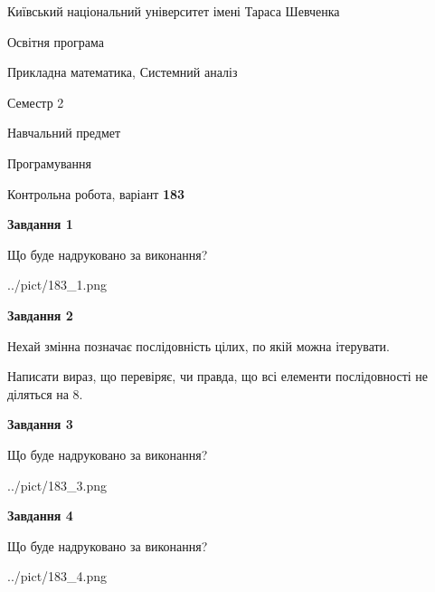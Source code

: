 \documentclass[12pt, ukrainian]{article}
\begin{document}
{{\begin {small}\par
{ \center  Київський національний університет імені Тараса Шевченка \par}
{\parbox {5 cm}{Освітня програма \hfill}{\parbox {8 cm}{Прикладна математика, Системний аналіз \hfill}}\parbox {5 cm}{\hfill Семестр 2}}\par
{\parbox {5 cm} {Навчальний предмет \hfill}\parbox {7 cm}{Програмування \hfill}\parbox {6cm}{\hfill}\par}\vspace{-7pt} \end{small}}{\center Контрольна робота, варіант  \No \textbf
{ 183 }\par}}
{
\begin {large}
{\begin {center}\textbf{Завдання 1}\end {center}}\par
Що буде надруковано за виконання?\par\par
\begin{center}
	{../pict/183_1.png}
\end{center}
\newpage

{\begin {center}\textbf{Завдання 2}\end {center}}\par
Нехай змінна  позначає послідовність цілих, по якій можна ітерувати.

Написати вираз, що перевіряє, чи правда, що всі елементи послідовності не діляться на 8.\par
\newpage

{\begin {center}\textbf{Завдання 3}\end {center}}\par
Що буде надруковано за виконання?
\begin{center}
	{../pict/183_3.png}
\end{center}
\newpage

{\begin {center}\textbf{Завдання 4}\end {center}}\par
Що буде надруковано за виконання?\par
\begin{center}
	{../pict/183_4.png}
\end{center}
\newpage


\end{large}}
\end{document}
